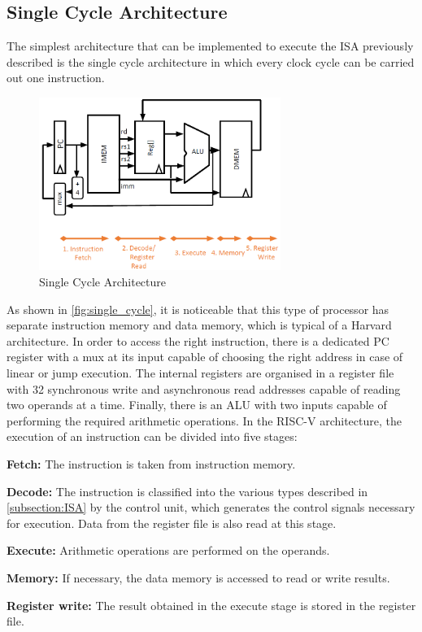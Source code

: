 \subsection{Single Cycle Architecture}
\label{subsection:single_cycle}
The simplest architecture that can be implemented to execute the ISA previously described is the single cycle architecture in which every clock cycle can be carried out one instruction.
\begin{figure}[h]
  \center
  \includegraphics[width=0.7\textwidth]{sec1/images/single_cycle.png}
  \caption{Single Cycle Architecture}
  \label{fig:single_cycle}
\end{figure}
As shown in \autoref{fig:single_cycle}, it is noticeable that this type of processor has separate instruction memory and data memory, which is typical of a Harvard architecture. In order to access the right instruction, there is a dedicated PC register with a mux at its input capable of choosing the right address in case of linear or jump execution. The internal registers are organised in a register file with 32 synchronous write and asynchronous read addresses capable of reading two operands at a time. Finally, there is an ALU with two inputs capable of performing the required arithmetic operations.
In the RISC-V architecture, the execution of an instruction can be divided into five stages:

\begin{description}
    \item \textbf{Fetch:} The instruction is taken from instruction memory.
    \item \textbf{Decode:} The instruction is classified into the various types described in \autoref{subsection:ISA} by the control unit, which generates the control signals necessary for execution. Data from the register file is also read at this stage.
    \item \textbf{Execute:} Arithmetic operations are performed on the operands.
    \item \textbf{Memory:} If necessary, the data memory is accessed to read or write results.
    \item \textbf{Register write:} The result obtained in the execute stage is stored in the register file.
\end{description}
